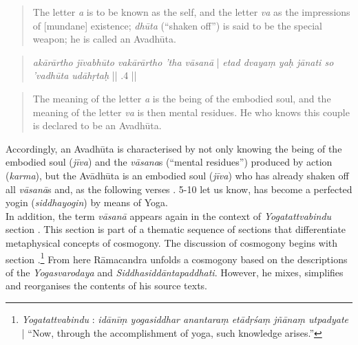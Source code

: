 \begin{quote}
  The letter \textit{a} is to be known as the self, and the letter \textit{va} as the impressions of [mundane] existence; \textit{dhūta} (``shaken off'') is said to be the special weapon; he is called an Avadhūta.
\end{quote}

\begin{quote}
  \textit{akārārtho jīvabhūto vakārārtho 'tha vāsanā} |
  \textit{etad dvayaṃ yaḥ jānati so 'vadhūta udāhṛtaḥ} || .4 ||
    \end{quote}

    \begin{quote}
      The meaning of the letter \textit{a} is the being of the embodied soul, and the meaning of the letter \textit{va} is then mental residues. He who knows this couple is declared to be an Avadhūta.
    \end{quote}
    
    Accordingly, an Avadhūta is characterised by not only knowing the being of the embodied soul (\textit{jīva}) and the \textit{vāsana}s (``mental residues'') produced by action (\textit{karma}), but the Avādhūta is an embodied soul (\textit{jīva}) who has already shaken off all \textit{vāsanā}s and, as the following verses . 5-10 let us know, has become a perfected yogin (\textit{siddhayogin}) by means of Yoga. \\
    
    In addition, the term \textit{vāsanā} appears again in the context of \textit{Yogatattvabindu} section . This section is part of a thematic sequence of sections that differentiate metaphysical concepts of cosmogony. The discussion of cosmogony begins with section .\footnote{\emph{Yogatattvabindu} : \textit{idānīṃ yogasiddhar anantaraṃ etādṛśaṃ jñānaṃ utpadyate} | ``Now, through the accomplishment of yoga, such knowledge arises.''} From here Rāmacandra unfolds a cosmogony based on the descriptions of the \textit{Yogasvarodaya} and \textit{Siddhasiddāntapaddhati}. However, he mixes, simplifies and reorganises the contents of his source texts.

